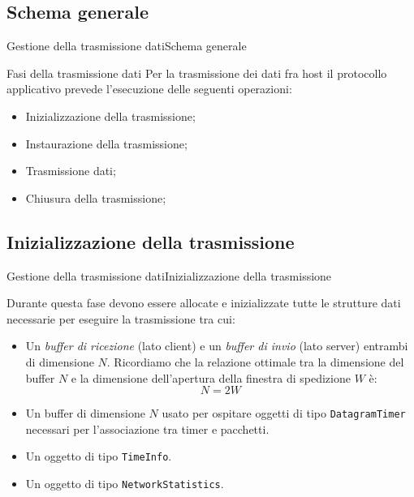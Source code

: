 \documentclass[10pt]{beamer}
\begin{document}
\subsection{Schema generale}
\begin{frame}[fragile]{Gestione della trasmissione dati}{Schema generale}


\begin{block}{Fasi della trasmissione dati}
Per la trasmissione dei dati fra host il protocollo applicativo prevede l'esecuzione delle seguenti operazioni:

\begin{itemize}
\item Inizializzazione della trasmissione;
\item Instaurazione della trasmissione;
\item Trasmissione dati;
\item Chiusura della trasmissione;
\end{itemize}

\end{block}
\end{frame}

\subsection{Inizializzazione della trasmissione}
\begin{frame}[fragile]{Gestione della trasmissione dati}{Inizializzazione della trasmissione}

Durante questa fase devono essere allocate e inizializzate tutte le strutture dati necessarie per eseguire la trasmissione tra cui:

\begin{itemize}
\item Un \textit{buffer di ricezione} (lato client) e un \textit{buffer di invio} (lato server) entrambi di dimensione $N$. Ricordiamo che la relazione ottimale tra la dimensione del buffer $N$ e la dimensione dell'apertura della finestra di spedizione
$W$ è:
\[
N = 2W
\]

\item Un buffer di dimensione $N$ usato per ospitare oggetti di tipo \texttt{DatagramTimer} necessari per l'associazione tra timer e pacchetti.
\item Un oggetto di tipo \texttt{TimeInfo}.
\item Un oggetto di tipo \texttt{NetworkStatistics}.
\end{itemize}

\end{frame}
\end{document}
